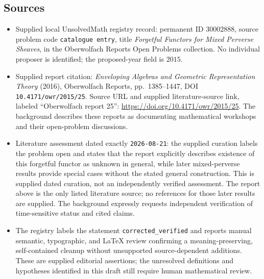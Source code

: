 \documentclass[11pt]{article}
\begin{document}
\subsection{Sources}
\begin{itemize}
\item Supplied local UnsolvedMath registry record: permanent ID \(30002888\), source problem code \texttt{catalogue entry}, title \emph{Forgetful Functors for Mixed Perverse Sheaves}, in the Oberwolfach Reports Open Problems collection. No individual proposer is identified; the proposed-year field is \(2015\).
\item Supplied report citation: \emph{Enveloping Algebras and Geometric Representation Theory} (2016), Oberwolfach Reports, pp.\ 1385--1447, DOI \texttt{10.4171/owr/2015/25}. Source URL and supplied literature-source link, labeled ``Oberwolfach report 25'': \url{https://doi.org/10.4171/owr/2015/25}. The background describes these reports as documenting mathematical workshops and their open-problem discussions.
\item Literature assessment dated exactly \texttt{2026-08-21}: the supplied curation labels the problem open and states that the report explicitly describes existence of this forgetful functor as unknown in general, while later mixed-perverse results provide special cases without the stated general construction. This is supplied dated curation, not an independently verified assessment. The report above is the only listed literature source; no references for those later results are supplied. The background expressly requests independent verification of time-sensitive status and cited claims.
\item The registry labels the statement \texttt{corrected\_verified} and reports manual semantic, typographic, and LaTeX review confirming a meaning-preserving, self-contained cleanup without unsupported source-dependent additions. These are supplied editorial assertions; the unresolved definitions and hypotheses identified in this draft still require human mathematical review.
\end{itemize}
\end{document}

